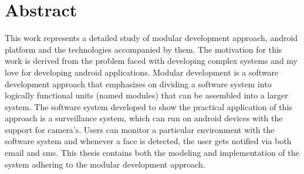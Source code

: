 \chapter*{\centering Abstract}
%
This work represents a detailed study of modular development approach, android platform and the technologies accompanied by them. The motivation for this work is derived from the problem faced with developing complex systems and my love for developing android applications. Modular development is a software development approach that emphasizes on dividing a software system into logically functional units (named modules) that can be assembled into a larger system. The software system developed to show the practical application of this approach is a surveillance system, which can run on android devices with the support for camera's. Users can monitor a particular environment with the software system and whenever a face is detected, the user gets notified via both email and sms. This thesis contains both the modeling and implementation of the system adhering to the modular development approach. 